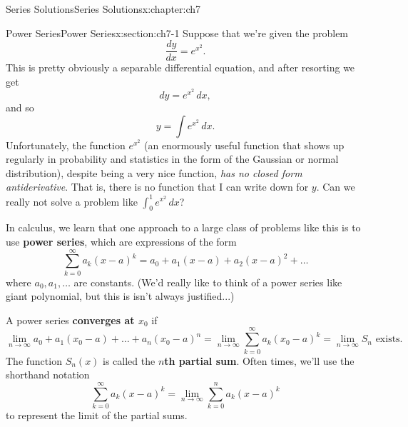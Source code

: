 \documentclass[oneside,10pt,]{book}
\newcommand{\terminology}[1]{\textbf{#1}}
\numberwithin{equation}{section}
\numberwithin{equation}{section}
\begin{document}
\begin{chapterptx}{Series Solutions}{}{Series Solutions}{}{}{x:chapter:ch7}
%
%
\typeout{************************************************}
\typeout{************************************************}
%
\begin{sectionptx}{Power Series}{}{Power Series}{}{}{x:section:ch7-1}
Suppose that we're given the problem%
\begin{equation*}
\frac{dy}{dx} = e^{x^2}.
\end{equation*}
This is pretty obviously a separable differential equation, and after resorting we get%
\begin{equation*}
dy = e^{x^2} \,dx,
\end{equation*}
and so%
\begin{equation*}
y = \int e^{x^2} \, dx.
\end{equation*}
Unfortunately, the function \(e^{x^2}\) (an enormously useful function that shows up regularly in probability and statistics in the form of the Gaussian or normal distribution), despite being a very nice function, \emph{has no closed form antiderivative}. That is, there is no function that I can write down for \(y\). Can we really not solve a problem like \(\int_0^1 e^{x^2}\, dx\)?%
\par
In calculus, we learn that one approach to a large class of problems like this is to use \terminology{power series}, which are expressions of the form%
\begin{equation*}
\sum_{k=0}^\infty a_k(x - a)^k = a_0 + a_1 (x-a) + a_2 (x-a)^2 + \ldots
\end{equation*}
where \(a_0, a_1,\ldots\) are constants. (We'd really like to think of a power series like giant polynomial, but this is isn't always justified...)%
\par
A power series \terminology{converges at \(x_0\)} if%
\begin{equation*}
\lim_{n \to \infty} a_0 + a_1 (x_0 - a) + \ldots + a_n (x_0 -a)^n = \lim_{n\to \infty} \sum_{k=0}^{\infty} a_k (x_0 - a)^k = \lim_{n\to \infty} S_n \text{ exists.}
\end{equation*}
The function \(S_n(x)\) is called the \terminology{\(n\)th partial sum}. Often times, we'll use the shorthand notation%
\begin{equation*}
\sum_{k=0}^\infty a_k (x - a)^k = \lim_{n\to\infty} \sum_{k=0}^n a_k(x-a)^k
\end{equation*}
to represent the limit of the partial sums.%
\par

\end{sectionptx}
\end{chapterptx}
\end{document}
